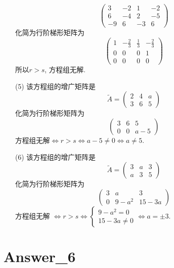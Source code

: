 \documentclass{article}
\begin{document}
\begin{itemize}
$$\begin{pmatrix}
        3 & -2 & 1 & -2 \\
        6 & -4 & 2 & -5 \\
        -9 & 6 & -3 & 6
        \end{pmatrix}        
        $$
    化简为行阶梯形矩阵为
    $$\begin{pmatrix}
        1 & -\frac{2}{3} & \frac{1}{3} & -\frac{2}{3} \\
        0 & 0 & 0 & 1 \\
        0 & 0 & 0 & 0
        \end{pmatrix}        
        $$
    所以$r > s$, 方程组无解.
    \item[(5)]
    该方程组的增广矩阵是
    $$\tilde{A} = \begin{pmatrix}
        2 & 4 & a \\
        3 & 6 & 5
        \end{pmatrix}        
    $$
    化简为行阶梯形矩阵为
    $$
    \begin{pmatrix}
        3 & 6 & 5 \\
        0 & 0 & a - 5
    \end{pmatrix}
    $$
    方程组无解$\Leftrightarrow  r > s \Leftrightarrow  a - 5 \neq 0 \Leftrightarrow a \neq 5$.
    \item[(6)]
    该方程组的增广矩阵是
    $$\tilde{A} = \begin{pmatrix}
        3 & a & 3 \\
        a & 3 & 5
        \end{pmatrix}        
    $$
    化简为行阶梯形矩阵为
    $$
    \begin{pmatrix}
        3 & a & 3 \\
        0 & 9 - a^2 & 15 - 3a
    \end{pmatrix}
    $$
    方程组无解 $\Leftrightarrow r > s \Leftrightarrow \begin{cases}
        9 - a^2 = 0 \\
        15 - 3a \neq 0
    \end{cases} \Leftrightarrow a = \pm 3$. 

\end{itemize}

\section{Answer\_6}
\end{document}
